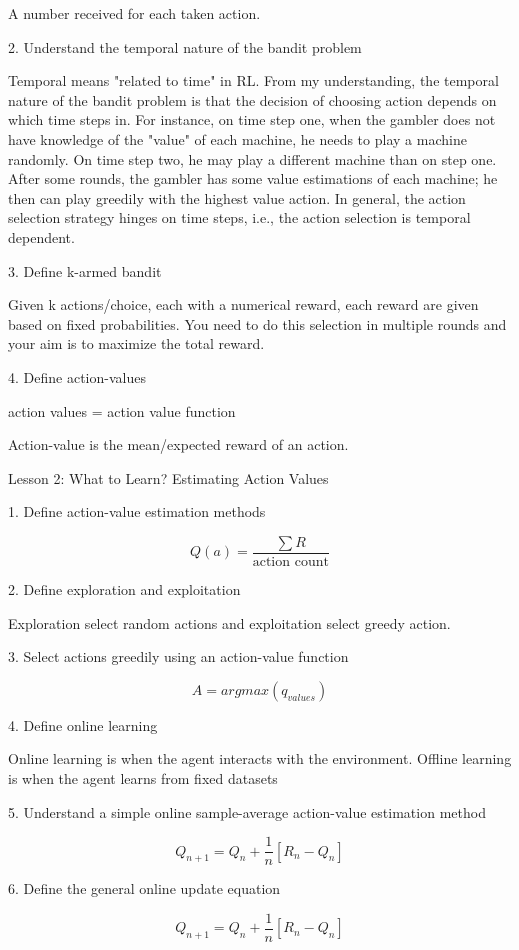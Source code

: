 \documentclass[sutton_barto_notes.tex]{subfiles}
\begin{document}
A number received for each taken action.

2. Understand the temporal nature of the bandit problem

Temporal means "related to time" in RL. From my understanding, the temporal nature of the bandit problem is that the decision of choosing action depends on which time steps in.
For instance, on time step one, when the gambler does not have knowledge of the "value" of each machine, he needs to play a machine randomly. On time step two, he may play a different machine than on step one. After some rounds, the gambler has some value estimations of each machine; he then can play greedily with the highest value action.
In general, the action selection strategy hinges on time steps, i.e., the action selection is temporal dependent.

3. Define k-armed bandit

Given k actions/choice, each with a numerical reward, each reward are given based on fixed probabilities. You need to do this selection in multiple rounds and your aim is to maximize the total reward.

4. Define action-values

action values = action value function

Action-value is the mean/expected reward of an action.


Lesson 2: What to Learn? Estimating Action Values

1. Define action-value estimation methods

$$Q(a) = \frac{\sum R}{\text{action count}}$$

2. Define exploration and exploitation

Exploration select random actions and exploitation select greedy action.

3. Select actions greedily using an action-value function

$$A = argmax(q_{values})$$

4. Define online learning

Online learning is when the agent interacts with the environment.
Offline learning is when the agent learns from fixed datasets

5. Understand a simple online sample-average action-value estimation method

$$Q_{n+1} = Q_n + \frac{1}{n}[R_n - Q_n]$$

6. Define the general online update equation

$$Q_{n+1} = Q_n + \frac{1}{n}[R_n - Q_n]$$
\end{document}
